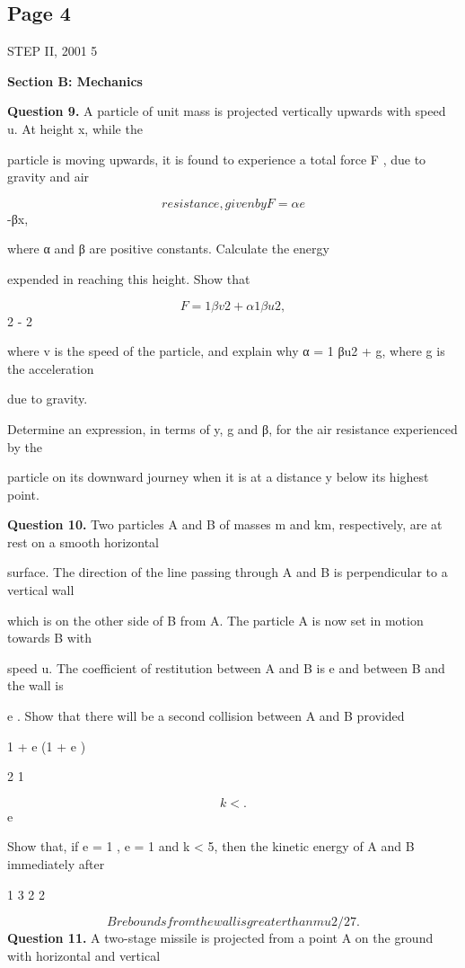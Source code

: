\documentclass[12pt]{article}
\begin{document}
\subsection*{Page 4}
\begin{flushleft}
STEP II, 2001 5\par
\bigskip\textbf{Section B: Mechanics}\par
\bigskip\textbf{Question 9.} A particle of unit mass is projected vertically upwards with speed u. At height x, while the\par
particle is moving upwards, it is found to experience a total force F , due to gravity and air\par
\[resistance, given by F = α e\]
-βx,\par
where α and β are positive constants. Calculate the energy\par
expended in reaching this height. Show that\par
\[F = 1 βv2 + α 1 βu2 ,\]
2 - 2\par
where v is the speed of the particle, and explain why α = 1 βu2 + g, where g is the acceleration\par
due to gravity.\par
Determine an expression, in terms of y, g and β, for the air resistance experienced by the\par
particle on its downward journey when it is at a distance y below its highest point.\par
\bigskip\textbf{Question 10.} Two particles A and B of masses m and km, respectively, are at rest on a smooth horizontal\par
surface. The direction of the line passing through A and B is perpendicular to a vertical wall\par
which is on the other side of B from A. The particle A is now set in motion towards B with\par
speed u. The coefficient of restitution between A and B is e and between B and the wall is\par
e . Show that there will be a second collision between A and B provided\par
1 + e (1 + e )\par
2 1\par
\[k < .\]
e\par
Show that, if e = 1 , e = 1 and k < 5, then the kinetic energy of A and B immediately after\par
1 3 2 2\par
\[B rebounds from the wall is greater than mu2/27.\]
\bigskip\textbf{Question 11.} A two-stage missile is projected from a point A on the ground with horizontal and vertical\par

\end{flushleft}
\end{document}
